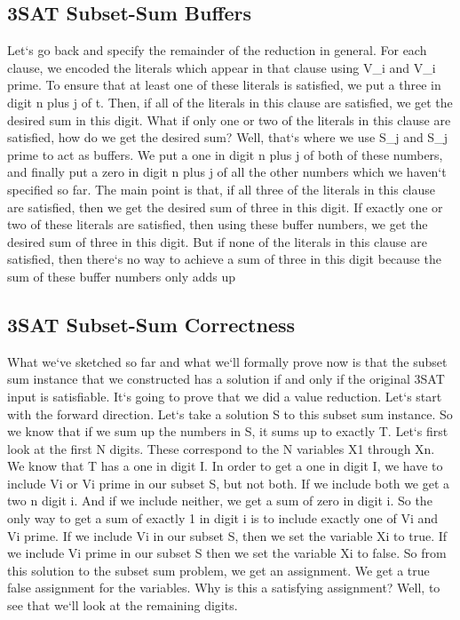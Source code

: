 \subsection{3SAT Subset-Sum  Buffers}
Let`s go back and specify the remainder of the reduction in general.
For each clause, we encoded the literals which appear in that clause using V\_i and V\_i prime.
To ensure that at least one of these literals is satisfied, we put a three in digit n plus j of t.
Then, if all of the literals in this clause are satisfied, we get the desired sum in this digit.
What if only one or two of the literals in this clause are satisfied, how do we get the desired sum? Well, that`s where we use S\_j and S\_j prime to act as buffers.
We put a one in digit n plus j of both of these numbers, and finally put a zero in digit n plus j of all the other numbers which we haven`t specified so far.
The main point is that, if all three of the literals in this clause are satisfied, then we get the desired sum of three in this digit.
If exactly one or two of these literals are satisfied, then using these buffer numbers, we get the desired sum of three in this digit.
But if none of the literals in this clause are satisfied, then there`s no way to achieve a sum of three in this digit because the sum of these buffer numbers only adds up

\subsection{3SAT Subset-Sum  Correctness}
What we`ve sketched so far and what we`ll formally prove now is that the subset sum instance that we constructed has a solution if and only if the original 3SAT input is satisfiable.
It`s going to prove that we did a value reduction.
Let`s start with the forward direction.
Let`s take a solution S to this subset sum instance.
So we know that if we sum up the numbers in S, it sums up to exactly T\@.
Let`s first look at the first N digits.
These correspond to the N variables X1 through Xn.
We know that T has a one in digit I\@.
In order to get a one in digit I, we have to include Vi or Vi prime in our subset S, but not both.
If we include both we get a two n digit i.
And if we include neither, we get a sum of zero in digit i.
So the only way to get a sum of exactly 1 in digit i is to include exactly one of Vi and Vi prime.
If we include Vi in our subset S, then we set the variable Xi to true.
If we include Vi prime in our subset S then we set the variable Xi to false.
So from this solution to the subset sum problem, we get an assignment.
We get a true false assignment for the variables.
Why is this a satisfying assignment? Well, to see that we`ll look at the remaining digits.

